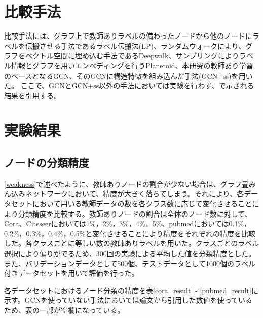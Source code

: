 \clearpage

\section{比較手法}
比較手法には、グラフ上で教師ありラベルの備わったノードから他のノードにラベルを伝搬させる手法であるラベル伝搬法(LP)\cite{LP}、ランダムウォークにより、グラフをベクトル空間に埋め込む手法であるDeepwalk\cite{DeepWalk}、サンプリングによりラベル情報とグラフを用いエンべディングを行うPlanetoid\cite{planetoid}、本研究の教師あり学習のベースとなるGCN\cite{gcn}、そのGCNに構造特徴を組み込んだ手法(GCN+ss)\cite{GCN+ss}を用いた。
ここで、GCNとGCN+ss以外の手法においては実験を行わず、\cite{gcn}で示される結果を引用する。


\section{実験結果}
\subsection{ノードの分類精度}
\ref{weakness}で述べたように、教師ありノードの割合が少ない場合は、グラフ畳みん込みネットワークにおいて、精度が大きく落ちてしまう。それにより、各データセットにおいて用いる教師データの数を各クラス数に応じて変化させることにより分類精度を比較する。教師ありノードの割合は全体のノード数に対して、Cora、Citeseerにおいては1\%，2\%，3\%，4\%，5\%、pubmedにおいては0.1\%，0.2\%，0.3\%，0.4\%，0.5\%と変化させることにより精度をそれぞれの精度を比較した。各クラスごとに等しい数の教師ありラベルを用いた。クラスごとのラベル選択により偏りがでるため、300回の実験による平均した値を分類精度とした。また、バリデーションデータとして500個、テストデータとして1000個のラベル付きデータセットを用いて評価を行った。

各データセットにおけるノード分類の精度を表\ref{cora_result} - \ref{pubmed_result}に示す。GCNを使っていない手法においては論文から引用した数値を使っているため、表の一部が空欄になっている。

